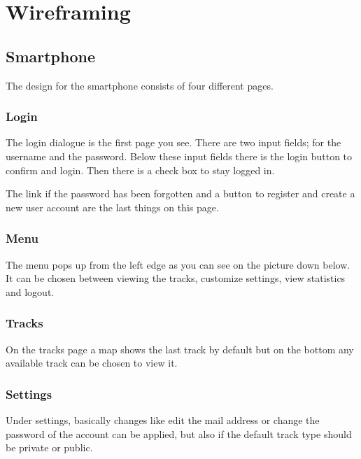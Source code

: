 \chapter{Wireframing}
\section{Smartphone}
The design for the smartphone consists of four different pages. 
\subsection{Login}
The login dialogue is the first page you see. There are two input fields; for the username and the password. Below these input fields there is the login button to confirm and login. Then there is a check box to stay logged in.

The link if the password has been forgotten and a button to register and create a new user account are the last things on this page.
\subsection{Menu}
The menu pops up from the left edge as you can see on the picture down below. It can be chosen between viewing the tracks, customize settings, view statistics and logout.
\subsection{Tracks}
On the tracks page a map shows the last track by default but on the bottom any available track can be chosen to view it.
\subsection{Settings}
Under settings, basically changes like edit the mail address or change the password of the account can be applied, but also if the default track type should be private or public.
